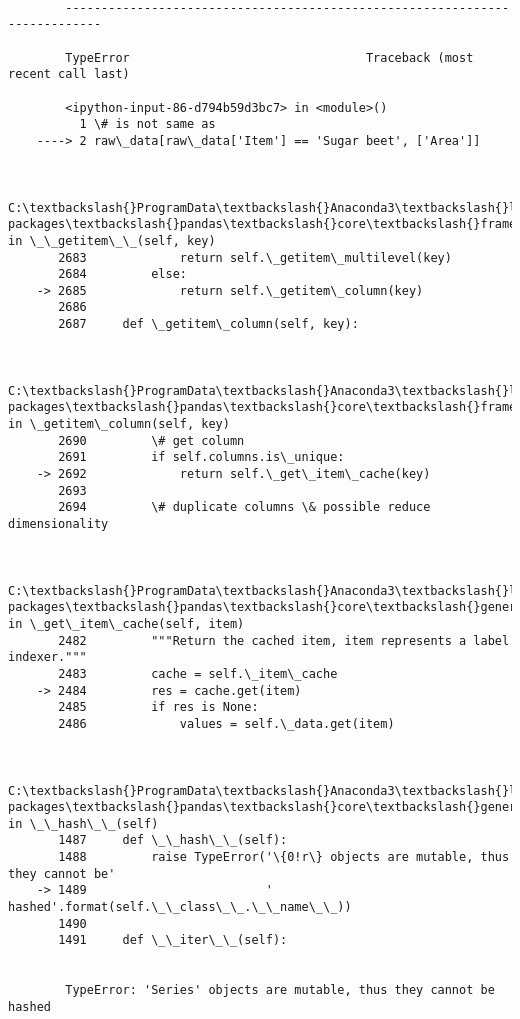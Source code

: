 \documentclass[11pt]{article}
\begin{document}
    \begin{Verbatim}[commandchars=\\\{\}]

        ---------------------------------------------------------------------------

        TypeError                                 Traceback (most recent call last)

        <ipython-input-86-d794b59d3bc7> in <module>()
          1 \# is not same as
    ----> 2 raw\_data[raw\_data['Item'] == 'Sugar beet', ['Area']]
    

        C:\textbackslash{}ProgramData\textbackslash{}Anaconda3\textbackslash{}lib\textbackslash{}site-packages\textbackslash{}pandas\textbackslash{}core\textbackslash{}frame.py in \_\_getitem\_\_(self, key)
       2683             return self.\_getitem\_multilevel(key)
       2684         else:
    -> 2685             return self.\_getitem\_column(key)
       2686 
       2687     def \_getitem\_column(self, key):
    

        C:\textbackslash{}ProgramData\textbackslash{}Anaconda3\textbackslash{}lib\textbackslash{}site-packages\textbackslash{}pandas\textbackslash{}core\textbackslash{}frame.py in \_getitem\_column(self, key)
       2690         \# get column
       2691         if self.columns.is\_unique:
    -> 2692             return self.\_get\_item\_cache(key)
       2693 
       2694         \# duplicate columns \& possible reduce dimensionality
    

        C:\textbackslash{}ProgramData\textbackslash{}Anaconda3\textbackslash{}lib\textbackslash{}site-packages\textbackslash{}pandas\textbackslash{}core\textbackslash{}generic.py in \_get\_item\_cache(self, item)
       2482         """Return the cached item, item represents a label indexer."""
       2483         cache = self.\_item\_cache
    -> 2484         res = cache.get(item)
       2485         if res is None:
       2486             values = self.\_data.get(item)
    

        C:\textbackslash{}ProgramData\textbackslash{}Anaconda3\textbackslash{}lib\textbackslash{}site-packages\textbackslash{}pandas\textbackslash{}core\textbackslash{}generic.py in \_\_hash\_\_(self)
       1487     def \_\_hash\_\_(self):
       1488         raise TypeError('\{0!r\} objects are mutable, thus they cannot be'
    -> 1489                         ' hashed'.format(self.\_\_class\_\_.\_\_name\_\_))
       1490 
       1491     def \_\_iter\_\_(self):
    

        TypeError: 'Series' objects are mutable, thus they cannot be hashed

    \end{Verbatim}
\end{document}
